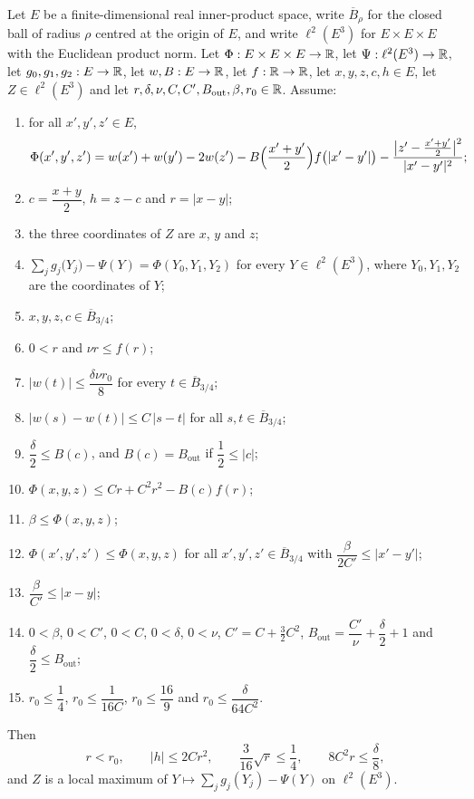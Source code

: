 \begin{lemma}
Let $E$ be a finite-dimensional real inner-product space, write $\overline B_\rho$
for the closed ball of radius $\rho$ centred at the origin of $E$, and write
$\ell^2(E^3)$ for $E\times E\times E$ with the Euclidean product norm. Let
$\Phi:E\times E\times E\to\mathbb{R}$, let $\Psi:\ell^2(E^3)\to\mathbb{R}$, let
$g_0,g_1,g_2:E\to\mathbb{R}$, let $w,B:E\to\mathbb{R}$, let $f:\mathbb{R}\to\mathbb{R}$, let
$x,y,z,c,h\in E$, let $Z\in\ell^2(E^3)$ and let
$r,\delta,\nu,C,C',B_{\mathrm{out}},\beta,r_0\in\mathbb{R}$. Assume:
\begin{enumerate}
\item\label{it:tpmg-Phi} for all $x',y',z'\in E$,
\[
  \Phi(x',y',z')=w(x')+w(y')-2w(z')
    -B\Bigl(\frac{x'+y'}{2}\Bigr)f\bigl(|x'-y'|\bigr)
    -\frac{\bigl|z'-\frac{x'+y'}{2}\bigr|^2}{|x'-y'|^2};
\]
\item\label{it:tpmg-data} $c=\dfrac{x+y}{2}$, $h=z-c$ and $r=|x-y|$;
\item\label{it:tpmg-Z} the three coordinates of $Z$ are $x$, $y$ and $z$;
\item\label{it:tpmg-val} $\displaystyle\sum_{j}g_j\bigl(Y_j\bigr)-\Psi(Y)
=\Phi(Y_0,Y_1,Y_2)$ for every $Y\in\ell^2(E^3)$, where $Y_0,Y_1,Y_2$ are the
coordinates of $Y$;
\item\label{it:tpmg-ball} $x,y,z,c\in\overline B_{3/4}$;
\item\label{it:tpmg-r} $0<r$ and $\nu r\le f(r)$;
\item\label{it:tpmg-small} $|w(t)|\le\dfrac{\delta\nu r_0}{8}$ for every
$t\in\overline B_{3/4}$;
\item\label{it:tpmg-lip} $|w(s)-w(t)|\le C\,|s-t|$ for all
$s,t\in\overline B_{3/4}$;
\item\label{it:tpmg-B} $\dfrac\delta2\le B(c)$, and $B(c)=B_{\mathrm{out}}$ if
$\dfrac12\le|c|$;
\item\label{it:tpmg-ub} $\Phi(x,y,z)\le Cr+C^2r^2-B(c)f(r)$;
\item\label{it:tpmg-max} $\beta\le\Phi(x,y,z)$;
\item\label{it:tpmg-attain} $\Phi(x',y',z')\le\Phi(x,y,z)$ for all
$x',y',z'\in\overline B_{3/4}$ with $\dfrac{\beta}{2C'}\le|x'-y'|$;
\item\label{it:tpmg-rlow} $\dfrac{\beta}{C'}\le|x-y|$;
\item\label{it:tpmg-consts} $0<\beta$, $0<C'$, $0<C$, $0<\delta$, $0<\nu$,
$C'=C+\tfrac32C^2$, $B_{\mathrm{out}}=\dfrac{C'}{\nu}+\dfrac\delta2+1$ and
$\dfrac\delta2\le B_{\mathrm{out}}$;
\item\label{it:tpmg-thr} $r_0\le\dfrac14$, $r_0\le\dfrac1{16C}$,
$r_0\le\dfrac{16}9$ and $r_0\le\dfrac{\delta}{64C^2}$.
\end{enumerate}
Then
\begin{equation}\label{eq:tpmg-concl}
  r<r_0,\qquad |h|\le2Cr^2,\qquad
  \frac3{16}\sqrt r\le\frac14,\qquad 8C^2r\le\frac\delta8,
\end{equation}
and $Z$ is a local maximum of
$Y\mapsto\sum_jg_j(Y_j)-\Psi(Y)$ on $\ell^2(E^3)$.
\end{lemma}
